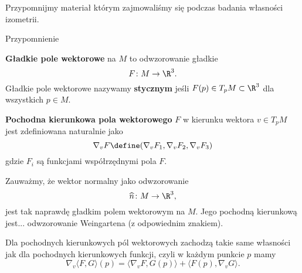 Przypomnijmy materiał którym zajmowaliśmy się podczas badania własności izometrii.
\begin{frame}[<+->]{Przypomnienie}

\begin{definicja}
\textbf{Gładkie pole wektorowe} na $M$ to odwzorowanie gładkie \[F\colon M\to \R^3.\]
Gładkie pole wektorowe nazywamy \textbf{stycznym} jeśli $F(p)\in T_pM\subset \R^3$ dla wszystkich $p\in M$.
\end{definicja}
\begin{definicja}
\textbf{Pochodna kierunkowa pola wektorowego} $F$ w kierunku wektora $v\in T_p M$ jest zdefiniowana naturalnie jako
\[\nabla_v F\define(\nabla_v F_1,\nabla_vF_2,\nabla_vF_3)\] gdzie $F_i$ są funkcjami współrzędnymi pola $F$.
\end{definicja}

\end{frame}
\begin{frame}

\begin{przyklad}
Zauważmy, że wektor normalny jako odwzorowanie
\[\widehat{n}\colon M\to\R^3,\]
jest tak naprawdę gładkim polem wektorowym na $M$. Jego pochodną kierunkową 
jest...  odwzorowanie Weingartena (z odpowiednim znakiem).
\end{przyklad}


\pause \begin{lemat}
Dla pochodnych kierunkowych pól wektorowych zachodzą takie same własności jak 
dla pochodnych kierunkowych funkcji, 
 \pause czyli w każdym punkcie $p$ mamy 
\[\nabla_v\langle F,G\rangle(p)=\langle\nabla_vF,G(p)\rangle+\langle F(p),\nabla_vG\rangle.\]
\end{lemat}
 
\end{frame}
